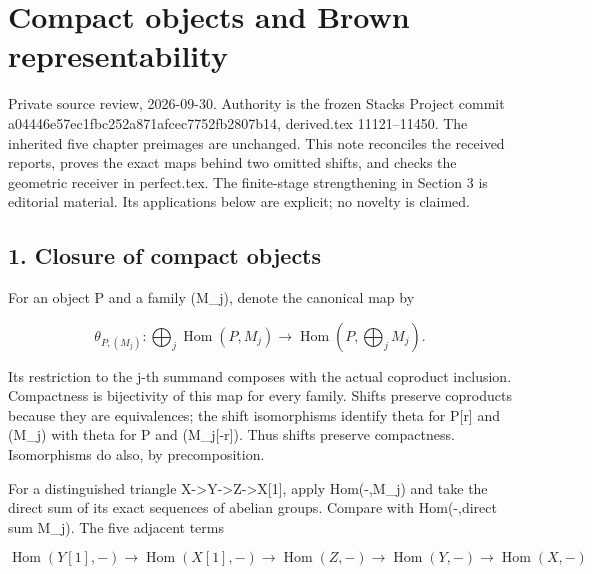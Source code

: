 \section{Compact objects and Brown representability}\label{proofs-11121-11450-compact-objects-and-brown-representability}

Private source review,\allowbreak{} 2026-09-30. Authority is the frozen Stacks Project commit a04446e5\allowbreak{}7ec1fbc2\allowbreak{}52a871af\allowbreak{}cec7752f\allowbreak{}b2807b14, derived.tex 11121–\allowbreak{}11450. The inherited five chapter preimages are unchanged. This note reconciles the received reports,\allowbreak{} proves the exact maps behind two omitted shifts,\allowbreak{} and checks the geometric receiver in perfect.tex. The finite-stage strengthening in Section 3 is editorial material. Its applications below are explicit; no novelty is claimed.

\subsection{1. Closure of compact objects}\label{proofs-11121-11450-closure-of-compact-objects}

For an object P and a family (M\_\allowbreak{}j)\allowbreak{},\allowbreak{} denote the canonical map by

\[
 \theta_{P,(M_j)}:\bigoplus_j\operatorname{Hom}(P,M_j)
       \longrightarrow\operatorname{Hom}(P,\bigoplus_jM_j).
\]

Its restriction to the j-th summand composes with the actual coproduct inclusion. Compactness is bijectivity of this map for every family. Shifts preserve coproducts because they are equivalences; the shift isomorphisms identify theta for P[r]\allowbreak{} and (M\_\allowbreak{}j)\allowbreak{} with theta for P and (M\_\allowbreak{}j[-r]\allowbreak{})\allowbreak{}. Thus shifts preserve compactness. Isomorphisms do also,\allowbreak{} by precomposition.

For a distinguished triangle X\allowbreak{}->Y\allowbreak{}->Z\allowbreak{}->X[1]\allowbreak{},\allowbreak{} apply Hom(-,\allowbreak{}M\_\allowbreak{}j)\allowbreak{} and take the direct sum of its exact sequences of abelian groups. Compare with Hom(-,\allowbreak{}direct sum M\_\allowbreak{}j)\allowbreak{}. The five adjacent terms

\[
 \operatorname{Hom}(Y[1],-)\longrightarrow
 \operatorname{Hom}(X[1],-)\longrightarrow
 \operatorname{Hom}(Z,-)\longrightarrow
 \operatorname{Hom}(Y,-)\longrightarrow
 \operatorname{Hom}(X,-)
\]

